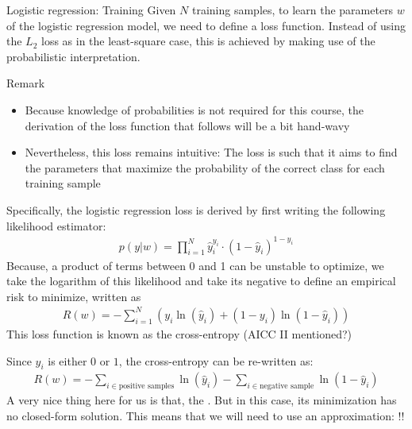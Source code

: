 \begin{parag}{Logistic regression: Training}
    Given $N$ training samples, to learn the parameters $w$ of the logistic regression model, we need to define a loss function. Instead of using the $L_2$ loss as in the least-square case, this is achieved by making use of the probabilistic interpretation.
	\begin{subparag}{Remark}
	    \begin{itemize}
			\item Because knowledge of probabilities is not required for this course, the derivation of the loss function that follows will be a bit hand-wavy
			\item Nevertheless, this loss remains intuitive: The loss is such that it aims to find the parameters that maximize the probability of the correct class for each training sample
	    \end{itemize}
	\end{subparag}
	Specifically, the logistic regression loss is derived by first writing the following likelihood estimator:
	\begin{align*} 
	p\left(y | w\right) = \prod_{i = 1}^{N} \hat{y}_i^{y_i} \cdot \left(1 - \hat{y}_i \right)^{1 - y_i}
	\end{align*}
	Because, a product of terms between 0 and 1 can be unstable to optimize, we take the logarithm of this likelihood and take its negative to define an empirical risk to minimize, written as 
	\begin{align*} 
		R\left(w\right) =  -\sum_{i = 1}^{N}\left(y_i \ln\left(\hat{y}_i \right) + \left(1 - y_i\right)\ln\left(1 - \hat{y}_i \right)\right)
	\end{align*}
	This loss function is known as the cross-entropy (AICC II mentioned?)
\end{parag}
Since $y_i$ is either $0$ or $1$, the cross-entropy can be re-written as:
\begin{align*} 
	R\left(w\right) = -\sum_{i \in \text{positive samples}} \ln\left(\hat{y}_i \right) - \sum_{i \in \text{negative sample}} \ln\left(1 - \hat{y}_i \right)
\end{align*}
A very nice thing here for us is that, the . But in this case, its minimization has no closed-form solution. This means that we will need to use an approximation: !!


